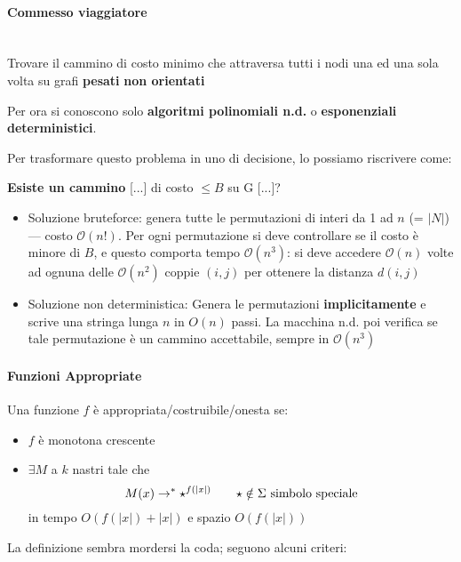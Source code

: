 \documentclass[a4paper,10pt,oneside]{article}
\theoremstyle{break}
\newcommand{\bigo}{\mathcal O}
\begin{document}
\begin{mdframed}
\paragraph{Commesso viaggiatore}\,\\ Trovare il cammino di costo minimo che attraversa tutti i nodi una ed una sola volta su grafi \textbf{pesati} \textbf{non orientati}

\dotfill

Per ora si conoscono solo \textbf{algoritmi polinomiali n.d.} o \textbf{esponenziali deterministici}.

\dotfill

Per trasformare questo problema in uno di decisione, lo possiamo riscrivere come:

\textbf{Esiste un cammino} [...] di costo $\leq B$ su G [...]?

\begin{itemize}
 \item Soluzione bruteforce: genera tutte le permutazioni di interi da 1 ad $n$ (= $|N|$) --- costo $\mathcal{O}(n!)$. Per ogni permutazione si deve controllare se il costo è minore di $B$, e questo comporta tempo $\mathcal{O}(n^3)$: si deve accedere $\bigo(n)$ volte ad ognuna delle $\bigo(n^2)$ coppie $(i, j)$ per ottenere la distanza $d(i, j)$
 \item Soluzione non deterministica: Genera le permutazioni \textbf{implicitamente} e scrive una stringa lunga $n$ in $O(n)$ passi. La macchina n.d. poi verifica se tale permutazione è un cammino accettabile, sempre in $\bigo(n^3)$
\end{itemize}


\end{mdframed}

\paragraph{Funzioni Appropriate} Una funzione $f$ è appropriata/costruibile/onesta se:
\begin{itemize}
 \item $f$ è monotona crescente
 \item $\exists M$ a $k$ nastri tale che \[M(x) \to^*\star^{f(|x|)} \text{\quad\quad $\star \notin \Sigma$ simbolo speciale}\] in tempo $O(f(|x|) + |x|)$ e spazio $O(f(|x|))$ \end{itemize}

 La definizione sembra mordersi la coda; seguono alcuni criteri:
\end{document}
